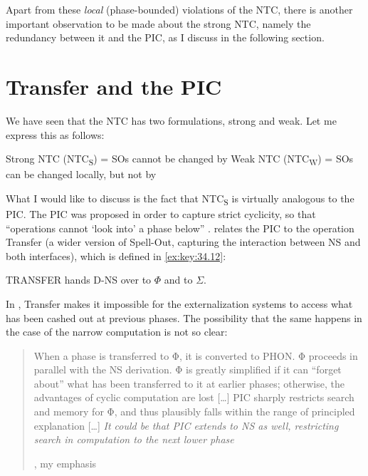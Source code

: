 \documentclass[output=paper]{langsci/langscibook}
\begin{document}
Apart from these \emph{local} (phase-bounded) violations of the \gls{NTC},
there is another important observation to be made about the strong \gls{NTC},
namely the redundancy between it and the \gls{PIC}, as I discuss in the
following section.

\section{Transfer and the PIC}\label{sec:34.3}

We have seen that the \gls{NTC} has two formulations, strong and weak. Let me
express this as follows:

\ea%
    \label{ex:key:34.11}
    \ea Strong \gls{NTC} (NTC\textsubscript{S}) = \glspl{SO} cannot be changed
    by 
    \ex Weak \gls{NTC} (NTC\textsubscript{W}) = \glspl{SO} can be changed
    locally, but not by 
	\z
\z

What I would like to discuss is the fact that NTC\textsubscript{S} is virtually
analogous to the \gls{PIC}. The \gls{PIC} was proposed in order to capture
strict cyclicity, so that \enquote{operations cannot ‘look into’ a phase below}
\citep[108]{Chomsky2000}. \citet{Chomsky2004} relates the \gls{PIC} to the
operation Transfer (a wider version of Spell-Out, capturing the interaction
between \gls{NS} and both interfaces), which is defined in \eqref{ex:key:34.12}:

\ea%
    \label{ex:key:34.12}
         TRANSFER hands D-\gls{NS} over to ${\Phi}$ and to ${\Sigma}$.
         \parencite[107]{Chomsky2004}
\z

In \citet{Chomsky2004}, Transfer makes it impossible for the externalization
systems to access what has been cashed out at previous phases. The possibility
that the same happens in the case of the narrow computation is not so clear:

\blockquote[{\citealt[107]{Chomsky2004}, my emphasis}][.]{When a phase is
    transferred to Φ, it is converted to PHON. Φ proceeds in parallel with the
    \gls{NS} derivation. Φ is greatly simplified if it can “forget about” what has
    been transferred to it at earlier phases; otherwise, the advantages of
    cyclic computation are lost [\dots{}] \gls{PIC} sharply restricts search
    and memory for Φ, and thus plausibly falls within the range of principled
    explanation [\dots{}] \emph{It could be that \gls{PIC} extends to \gls{NS} as
well, restricting search in computation to the next lower phase}}
\end{document}
